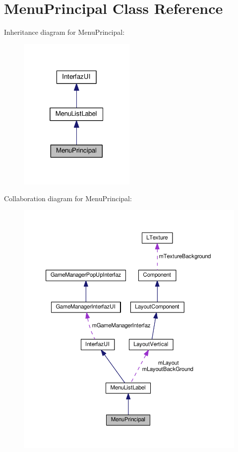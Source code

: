 \hypertarget{class_menu_principal}{}\section{Menu\+Principal Class Reference}
\label{class_menu_principal}


Inheritance diagram for Menu\+Principal\+:\nopagebreak
\begin{figure}[H]
\begin{center}
\leavevmode
\includegraphics[width=160pt]{class_menu_principal__inherit__graph}
\end{center}
\end{figure}


Collaboration diagram for Menu\+Principal\+:
\nopagebreak
\begin{figure}[H]
\begin{center}
\leavevmode
\includegraphics[width=350pt]{class_menu_principal__coll__graph}
\end{center}
\end{figure}
